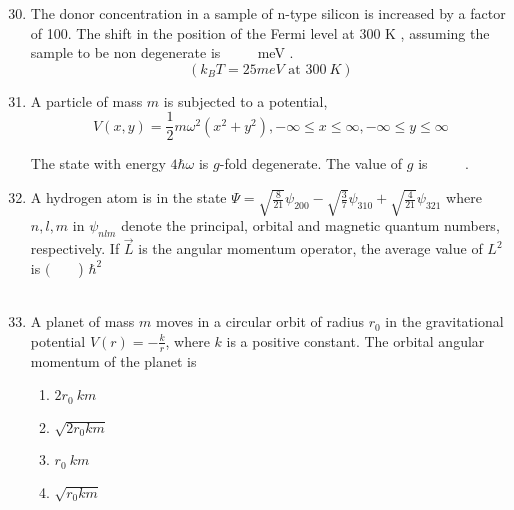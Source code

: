 \documentclass[journal]{IEEEtran}
\begin{document}
\begin{enumerate}
		\setcounter{enumi}{29}
    

 
    \item  The donor concentration in a sample of n-type silicon is increased by a factor of 100. The shift in the position of the Fermi level at 300 K , assuming the sample to be non degenerate is $\qquad$ meV .
$$
(k_{B} T=25 {meV} \text { at } 300 {~K})
$$
   
        
  \item   A particle of mass $m$ is subjected to a potential,
$$
V(x, y)=\frac{1}{2} m \omega^{2}(x^{2}+y^{2}),-\infty \leq x \leq \infty,-\infty \leq y \leq \infty
$$

The state with energy $4 \hbar \omega$ is $g$-fold degenerate. The value of $g$ is $\qquad$ .
 
  
  \item A hydrogen atom is in the state
$\Psi=\sqrt{\frac{8}{21}} \psi_{200}-\sqrt{\frac{3}{7}} \psi_{310}+\sqrt{\frac{4}{21}} \psi_{321}$
where $n, l, m$ in $\psi_{n l m}$ denote the principal, orbital and magnetic quantum numbers, respectively. If $\vec{L}$ is the angular momentum operator, the average value of $L^{2}$ is $(\qquad$) $\hbar^{2}$\\\\
  
  \item A planet of mass $m$ moves in a circular orbit of radius $r_{0}$ in the gravitational potential $V(r)=-\frac{k}{r}$, where $k$ is a positive constant. The orbital angular momentum of the planet is
  \begin{multicols}{4}
			\begin{enumerate}
   \item $2 r_{0} {~km}$
\item $\sqrt{2 r_{0} k m}$
\item $r_{0} {~km}$
\item  $\sqrt{r_{0} k m}$
\end{enumerate}
		\end{multicols}
   

\end{enumerate}
\end{document}
